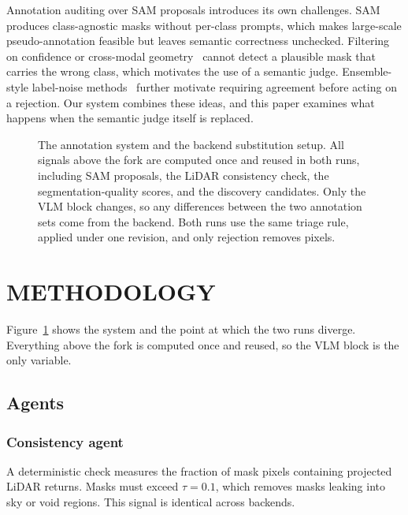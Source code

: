 \documentclass[a4paper,twoside]{article}
\begin{document}
Annotation auditing over SAM proposals introduces its own challenges.  
SAM~\cite{kirillov2023sam} produces class-agnostic masks without per-class prompts, which makes large-scale pseudo-annotation feasible but leaves semantic correctness unchecked.  
Filtering on confidence or cross-modal geometry~\cite{zou2019confidence,jaritz2020xmuda} cannot detect a plausible mask that carries the wrong class, which motivates the use of a semantic judge.  
Ensemble-style label-noise methods~\cite{malach2017decoupling,han2018co} further motivate requiring agreement before acting on a rejection.  
Our system combines these ideas, and this paper examines what happens when the semantic judge itself is replaced.

\begin{figure}[t]
    \centering
    \resizebox{\columnwidth}{!}{}
    \caption{
    The annotation system and the backend substitution setup.
    All signals above the fork are computed once and reused in both runs, including SAM proposals, the LiDAR consistency check, the segmentation‑quality scores, and the discovery candidates.
    Only the VLM block changes, so any differences between the two annotation sets come from the backend.
    Both runs use the same triage rule, applied under one revision, and only rejection removes pixels.
    }
    \label{fig:architecture}
\end{figure}


\section{\uppercase{Methodology}}
\label{sec:methodology}

Figure~\ref{fig:architecture} shows the system and the point at which the two runs diverge.
Everything above the fork is computed once and reused, so the VLM block is the only variable.

\subsection{Agents}

\subsubsection{Consistency agent}
A deterministic check measures the fraction of mask pixels containing projected LiDAR returns.  
Masks must exceed $\tau = 0.1$, which removes masks leaking into sky or void regions.  
This signal is identical across backends.
\end{document}
